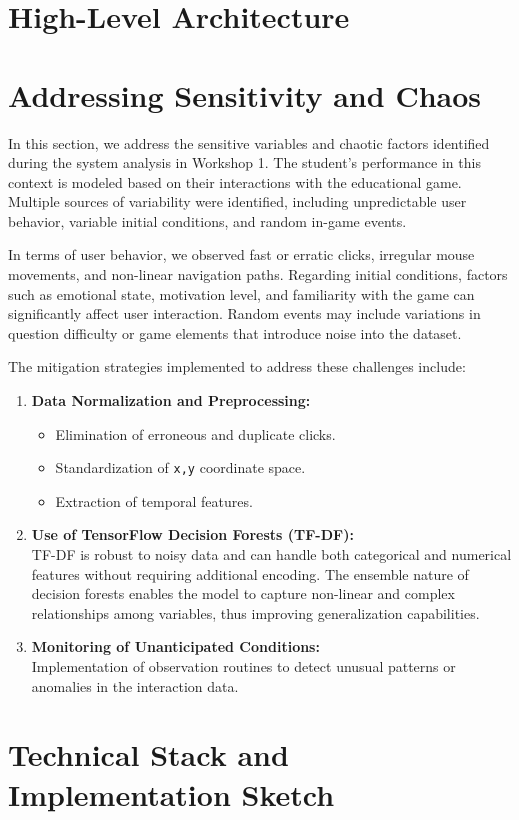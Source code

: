 \documentclass{article}
\begin{document}
\section{High-Level Architecture}

\section{Addressing Sensitivity and Chaos}
In this section, we address the sensitive variables and chaotic factors identified during the system analysis in Workshop 1. The student’s performance in this context is modeled based on their interactions with the educational game. Multiple sources of variability were identified, including unpredictable user behavior, variable initial conditions, and random in-game events.

In terms of user behavior, we observed fast or erratic clicks, irregular mouse movements, and non-linear navigation paths. Regarding initial conditions, factors such as emotional state, motivation level, and familiarity with the game can significantly affect user interaction. Random events may include variations in question difficulty or game elements that introduce noise into the dataset.

The mitigation strategies implemented to address these challenges include:

\begin{enumerate}
    \item \textbf{Data Normalization and Preprocessing:}
    \begin{itemize}
        \item Elimination of erroneous and duplicate clicks.
        \item Standardization of \texttt{x,y} coordinate space.
        \item Extraction of temporal features.
    \end{itemize}
    
    \item \textbf{Use of TensorFlow Decision Forests (TF-DF):} \\
    TF-DF is robust to noisy data and can handle both categorical and numerical features without requiring additional encoding. The ensemble nature of decision forests enables the model to capture non-linear and complex relationships among variables, thus improving generalization capabilities.

    \item \textbf{Monitoring of Unanticipated Conditions:} \\
    Implementation of observation routines to detect unusual patterns or anomalies in the interaction data.
\end{enumerate}
\section{Technical Stack and Implementation Sketch}
\end{document}
